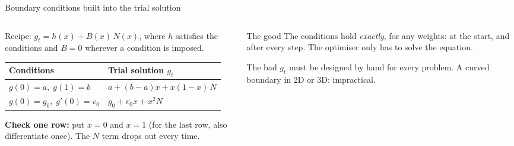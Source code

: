 \documentclass[10pt,aspectratio=169]{beamer}
\begin{document}
\begin{frame}{Boundary conditions built into the trial solution}
\begin{columns}[T]
\begin{column}{0.5\textwidth}
\small
Recipe: $g_t=h(x)+B(x)\,N(x)$, where $h$ satisfies the conditions and
$B=0$ wherever a condition is imposed.
\begin{center}
\setlength{\tabcolsep}{4pt}
\begin{tabular}{@{}ll@{}}
\toprule
Conditions & Trial solution $g_t$\\
\midrule
$g(0)=a,\;g(1)=b$ & $a+(b-a)x+x(1-x)\,N$\\
$g(0)=g_0,\;g'(0)=v_0$ & $g_0+v_0x+x^{2}N$\\
\bottomrule
\end{tabular}
\end{center}
\textbf{Check one row:} put $x=0$ and $x=1$ (for the last row, also
differentiate once).  The $N$ term drops out every time.
\end{column}
\begin{column}{0.48\textwidth}
\begin{block}{The good}
The conditions hold \emph{exactly}, for any weights: at the start, and
after every step.  The optimiser only has to solve the equation.
\end{block}
\begin{block}{The bad}
$g_t$ must be designed by hand for every problem. A curved boundary in 2D or
3D: impractical.
\end{block}
\end{column}
\end{columns}
\end{frame}
\end{document}
